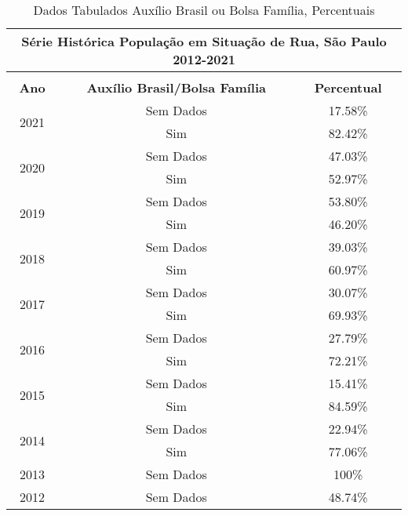 \documentclass[14pt]{extarticle}
\begin{document}
\begin{table}[htbp]
  \centering
   \caption{Dados Tabulados Auxílio Brasil ou Bolsa Família, Percentuais}
  \tabcolsep=0.15cm
	\renewcommand{\arraystretch}{1.0}
	\begin{adjustbox}{max width=\linewidth}
    \begin{tabular}{ccc}
    \toprule
    \multicolumn{3}{c}{Série Histórica População em Situação de Rua, São Paulo 2012-2021} \\
    \midrule
         &      &  \\
    \midrule
    \rowcolor[rgb]{ .906,  .902,  .902} \textbf{Ano} & \textbf{Auxílio Brasil/Bolsa Família} & \textbf{Percentual} \\
    \midrule
    \multirow{2}[2]{*}{2021} & Sem Dados & 17.58\% \\
         & Sim  & 82.42\% \\
    \midrule
    \multirow{2}[2]{*}{2020} & Sem Dados & 47.03\% \\
         & Sim  & 52.97\% \\
    \midrule
    \multirow{2}[2]{*}{2019} & Sem Dados & 53.80\% \\
         & Sim  & 46.20\% \\
    \midrule
    \multirow{2}[2]{*}{2018} & Sem Dados & 39.03\% \\
         & Sim  & 60.97\% \\
    \midrule
    \multirow{2}[2]{*}{2017} & Sem Dados & 30.07\% \\
         & Sim  & 69.93\% \\
    \midrule
    \multirow{2}[2]{*}{2016} & Sem Dados & 27.79\% \\
         & Sim  & 72.21\% \\
    \midrule
    \multirow{2}[2]{*}{2015} & Sem Dados & 15.41\% \\
         & Sim  & 84.59\% \\
    \midrule
    \multirow{2}[2]{*}{2014} & Sem Dados & 22.94\% \\
         & Sim  & 77.06\% \\
    \midrule
    2013 & Sem Dados & 100\% \\
    \midrule
    2012 & Sem Dados & 48.74\% \\
    \bottomrule
    \end{tabular}%
    \end{adjustbox}
  \label{tab:tab_bolsa_familia1}%
\end{table}%
\end{document}
